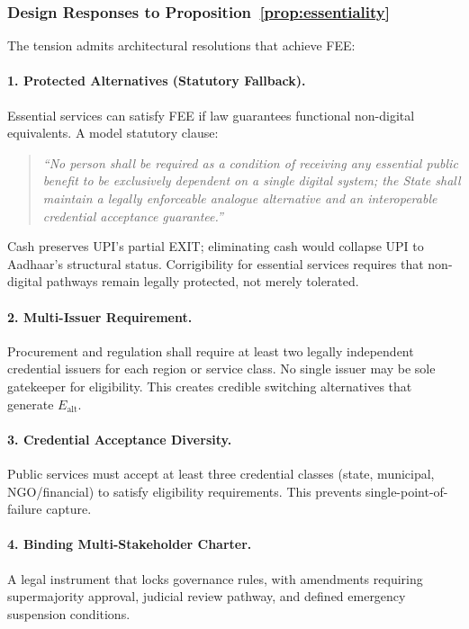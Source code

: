 \documentclass{article}
\begin{document}
\subsubsection{Design Responses to Proposition~\ref{prop:essentiality}}
\label{subsubsec:arch-responses}

The tension admits architectural resolutions that achieve FEE:

\paragraph{1. Protected Alternatives (Statutory Fallback).} Essential services can satisfy FEE if law guarantees functional non-digital equivalents. A model statutory clause:

\begin{quote}
\textit{``No person shall be required as a condition of receiving any essential public benefit to be exclusively dependent on a single digital system; the State shall maintain a legally enforceable analogue alternative and an interoperable credential acceptance guarantee.''}
\end{quote}

Cash preserves UPI's partial EXIT; eliminating cash would collapse UPI to Aadhaar's structural status. Corrigibility for essential services requires that non-digital pathways remain legally protected, not merely tolerated.

\paragraph{2. Multi-Issuer Requirement.} Procurement and regulation shall require at least two legally independent credential issuers for each region or service class. No single issuer may be sole gatekeeper for eligibility. This creates credible switching alternatives that generate $E_{\text{alt}}$.

\paragraph{3. Credential Acceptance Diversity.} Public services must accept at least three credential classes (state, municipal, NGO/financial) to satisfy eligibility requirements. This prevents single-point-of-failure capture.

\paragraph{4. Binding Multi-Stakeholder Charter.} A legal instrument that locks governance rules, with amendments requiring supermajority approval, judicial review pathway, and defined emergency suspension conditions.
\end{document}
